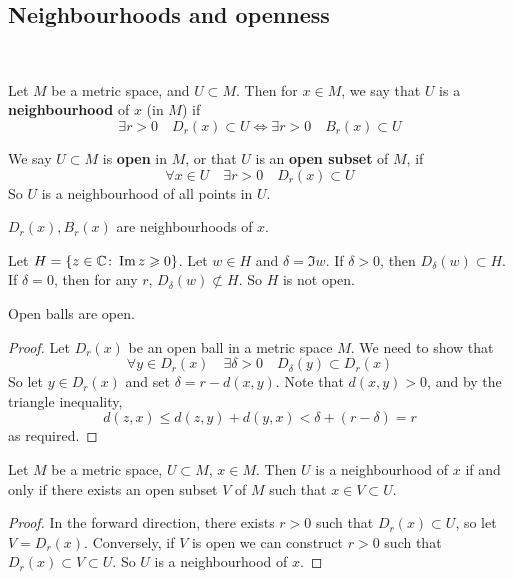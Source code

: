 \documentclass[a4paper]{article}
\begin{document}
\subsection{Neighbourhoods and openness}\ \vspace{-1.5em}
\begin{definition}
	Let \( M \) be a metric space, and \( U \subset M \).
	Then for \( x \in M \), we say that \( U \) is a \textbf{neighbourhood} of \( x \) (in \( M \)) if
	\[
		\exists r > 0\quad D_r(x) \subset U \iff \exists r > 0\quad B_r(x) \subset U
	\]
\end{definition}
\begin{definition}
	We say \( U \subset M \) is \textbf{open} in \( M \), or that \( U \) is an \textbf{open subset} of \( M \), if
	\[
		\forall x \in U\quad \exists r > 0\quad D_r(x) \subset U
	\]
	So \( U \) is a neighbourhood of all points in \( U \).
\end{definition}
\begin{example}
	\( D_r(x), B_r(x) \) are neighbourhoods of \( x \).
\end{example}
\begin{example}
	Let \( H = \qty{ z \in \mathbb C \colon \Im z \geqslant0 } \).
	Let \( w \in H \) and \( \delta = \Im w \).
	If \( \delta > 0 \), then \( D_\delta(w) \subset H \).
	If \( \delta = 0 \), then for any \( r \), \( D_\delta(w) \not\subset H \).
	So \( H \) is not open.
\end{example}
\begin{lemma}
	Open balls are open.
\end{lemma}
\begin{proof}
	Let \( D_r(x) \) be an open ball in a metric space \( M \).
	We need to show that
	\[
		\forall y \in D_r(x)\quad \exists \delta > 0\quad D_\delta(y) \subset D_r(x)
	\]
	So let \( y \in D_r(x) \) and set \( \delta = r - d(x,y) \).
	Note that \( d(x,y) > 0 \), and by the triangle inequality,
	\[
		d(z,x) \leq d(z,y) + d(y,x) < \delta + (r-\delta) = r
	\]
	as required.
\end{proof}
\begin{corollary}
	Let \( M \) be a metric space, \( U \subset M \), \( x \in M \).
	Then \( U \) is a neighbourhood of \( x \) if and only if there exists an open subset \( V \) of \( M \) such that \( x \in V \subset U \).
\end{corollary}
\begin{proof}
	In the forward direction, there exists \( r > 0 \) such that \( D_r(x) \subset U \), so let \( V = D_r(x) \).
	Conversely, if \( V \) is open we can construct \( r > 0 \) such that \( D_r(x) \subset V \subset U \).
	So \( U \) is a neighbourhood of \( x \).
\end{proof}
\end{document}
